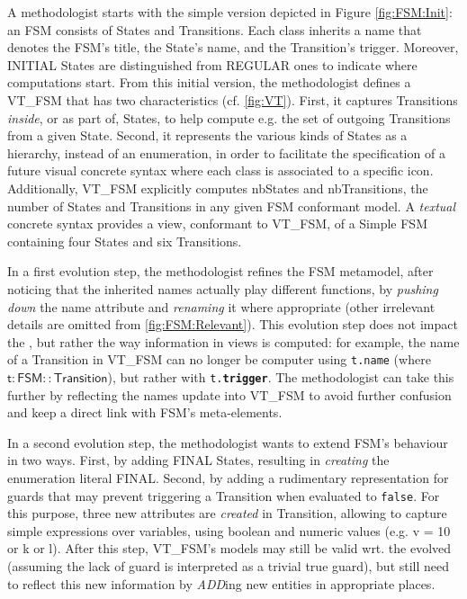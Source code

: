 A methodologist starts with the simple version depicted in Figure \ref{fig:FSM:Init}:
an \textsf{FSM} consists of \textsf{State}s and \textsf{Transition}s. Each class
inherits a \textsf{name} that denotes the \textsf{FSM}'s title, the \textsf{State}'s
name, and the \textsf{Transition}'s trigger. Moreover, \textsf{INITIAL} \textsf{State}s
are distinguished from \textsf{REGULAR} ones to indicate where computations start.
From this initial version, the methodologist defines a \viewtype \textsf{VT\_FSM}
that has two characteristics (cf. \autoref{fig:VT}). First, it captures \textsf{Transition}s \emph{inside},
or as part of, \textsf{State}s, to help compute e.g. the set of outgoing 
\textsf{Transition}s from a given \textsf{State}. Second, it represents the various
\textsf{kind}s of \textsf{State}s as a hierarchy, instead of an enumeration,
in order to facilitate the specification of a future visual concrete syntax where
each class is associated to a specific icon.
Additionally, \textsf{VT\_FSM} explicitly computes \textsf{nbStates} and 
\textsf{nbTransitions}, the number of \textsf{State}s and \textsf{Transition}s 
in any given \textsf{FSM} conformant model. A \emph{textual} concrete syntax 
provides a view, conformant to \textsf{VT\_FSM}, of a \textsf{Simple FSM} containing
four \textsf{State}s and six \textsf{Transition}s.


In a first evolution step, the methodologist refines the \textsf{FSM} metamodel,
after noticing that the inherited \textsf{name}s actually play different functions,
by  \emph{pushing down} the \textsf{name} attribute and \emph{renaming} it where
appropriate (other irrelevant details are omitted from \autoref{fig:FSM:Relevant}). 
This evolution step does not impact the \viewtypes, but rather the way information
in views is computed: for example, the \textsf{name} of a \textsf{Transition} in
\textsf{VT\_FSM} can no longer be computer using \texttt{t.name} (where 
$\mathsf{t : FSM::Transition}$), but rather with \texttt{t.\textbf{trigger}}. 
The methodologist can take this further by reflecting the \textsf{name}s update
into \textsf{VT\_FSM} to avoid further confusion and keep a direct link with
\textsf{FSM}'s meta-elements.

In a second evolution step, the methodologist wants to extend \textsf{FSM}'s 
behaviour in two ways. First, by adding \textsf{FINAL} \textsf{State}s,
resulting in \emph{creating} the enumeration literal \textsf{FINAL}.
Second, by adding a rudimentary representation for guards that may prevent 
triggering a \textsf{Transition} when evaluated to \texttt{false}. 
For this purpose, three new attributes are \emph{created} in \textsf{Transition}, allowing to capture
simple expressions over \textsf{var}iables, using boolean and numeric \textsf{value}s
(e.g. \textsf{v = 10} or \textsf{k or l}). After this step, \textsf{VT\_FSM}'s
models may still be valid wrt. the evolved \metamodel (assuming the lack of 
guard is interpreted as a trivial \textsf{true} guard),
but \viewtypes still need to reflect this new information by \emph{ADD}ing new 
entities in appropriate places.

